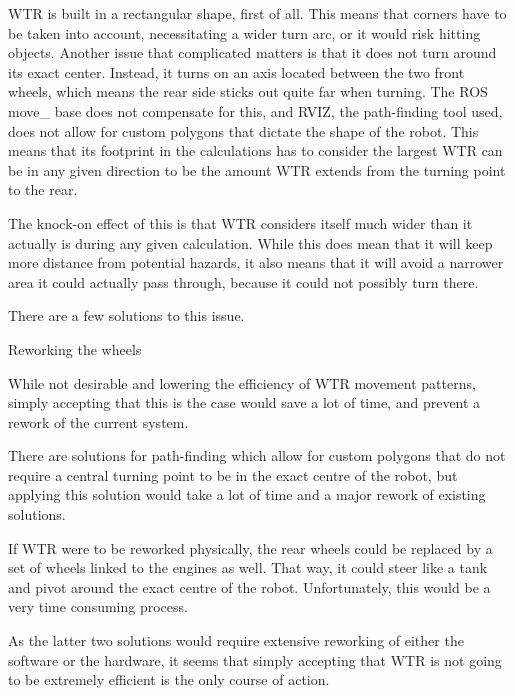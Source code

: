 WTR is built in a rectangular shape, first of all.
This means that corners have to be taken into account, necessitating a wider turn arc, or it would risk hitting objects.
Another issue that complicated matters is that it does not turn around its exact center.
Instead, it turns on an axis located between the two front wheels, which means the rear side sticks out quite far when turning.
The ROS move\_ base does not compensate for this, and RVIZ, the path-finding tool used, does not allow for custom polygons that dictate the shape of the robot.
This means that its footprint in the calculations has to consider the largest WTR can be in any given direction to be the amount WTR extends from the turning point to the rear.

The knock-on effect of this is that WTR considers itself much wider than it actually is during any given calculation.
While this does mean that it will keep more distance from potential hazards, it also means that it will avoid a narrower area it could actually pass through, because it could not possibly turn there.

There are a few solutions to this issue.
\begin{labeling}{Reworking the wheels}
\item [Accepting it] While not desirable and lowering the efficiency of WTR movement patterns, simply accepting that this is the case would save a lot of time, and prevent a rework of the current system.
\item [Changing Software] There are solutions for path-finding which allow for custom polygons that do not require a central turning point to be in the exact centre of the robot, but applying this solution would take a lot of time and a major rework of existing solutions.
\item [Reworking the wheels] If WTR were to be reworked physically, the rear wheels could be replaced by a set of wheels linked to the engines as well. That way, it could steer like a tank and pivot around the exact centre of the robot. Unfortunately, this would be a very time consuming process.
\end{labeling}

As the latter two solutions would require extensive reworking of either the software or the hardware, it seems that simply accepting that WTR is not going to be extremely efficient is the only course of action.

\newpage